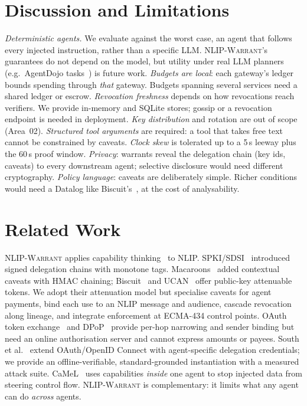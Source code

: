 \documentclass[sigconf,nonacm]{acmart}
\newcommand{\sys}{\textsc{NLIP-Warrant}}
\begin{document}
\section{Discussion and Limitations}
\emph{Deterministic agents.} We evaluate against the worst case, an agent that follows every injected instruction, rather than a specific LLM. \sys{}'s guarantees do not depend on the model, but utility under real LLM planners (e.g.\ AgentDojo tasks~\cite{agentdojo}) is future work. \emph{Budgets are local}: each gateway's ledger bounds spending through \emph{that} gateway. Budgets spanning several services need a shared ledger or escrow. \emph{Revocation freshness} depends on how revocations reach verifiers. We provide in-memory and SQLite stores; gossip or a revocation endpoint is needed in deployment. \emph{Key distribution} and rotation are out of scope (Area~02). \emph{Structured tool arguments} are required: a tool that takes free text cannot be constrained by caveats. \emph{Clock skew} is tolerated up to a 5\,s leeway plus the 60\,s proof window. \emph{Privacy}: warrants reveal the delegation chain (key ids, caveats) to every downstream agent; selective disclosure would need different cryptography. \emph{Policy language}: caveats are deliberately simple. Richer conditions would need a Datalog like Biscuit's~\cite{biscuit}, at the cost of analysability.

\section{Related Work}
\sys{} applies capability thinking~\cite{saltzer1975,hardy1988} to NLIP. SPKI/SDSI~\cite{rfc2693} introduced signed delegation chains with monotone tags. Macaroons~\cite{macaroons} added contextual caveats with HMAC chaining; Biscuit~\cite{biscuit} and UCAN~\cite{ucan} offer public-key attenuable tokens. We adopt their attenuation model but specialise caveats for agent payments, bind each use to an NLIP message and audience, cascade revocation along lineage, and integrate enforcement at ECMA-434 control points. OAuth token exchange~\cite{rfc8693} and DPoP~\cite{rfc9449} provide per-hop narrowing and sender binding but need an online authorisation server and cannot express amounts or payees. South et al.~\cite{south2025} extend OAuth/OpenID Connect with agent-specific delegation credentials; we provide an offline-verifiable, standard-grounded instantiation with a measured attack suite. CaMeL~\cite{camel} uses capabilities \emph{inside} one agent to stop injected data from steering control flow. \sys{} is complementary: it limits what any agent can do \emph{across} agents.
\end{document}
